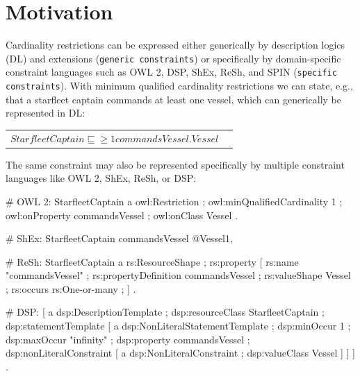 \documentclass{llncs}
\newcommand{\ms}[1]{\texttt{#1}}
\newenvironment{DL}{
  \vspace{0.3cm}
	\begin{center}
  \begin{tabular}{r l}

}{
  \end{tabular}
	\end{center}
}
\begin{document}


\section{Motivation}

Cardinality restrictions can be expressed either generically by description logics (DL) and extensions (\ms{generic constraints}) 
or specifically  by domain-specific constraint languages such as OWL 2, DSP, ShEx, ReSh, and SPIN (\ms{specific constraints}).
With minimum qualified cardinality restrictions we can state, 
e.g., that a starfleet captain commands at least one vessel, which can generically be represented in DL:

\begin{DL}
$StarfleetCaptain \sqsubseteq \geq1 commandsVessel . Vessel $
\end{DL}

The same constraint may also be represented specifically by multiple constraint languages like OWL 2, ShEx, ReSh, or DSP:

\begin{ex}
# OWL 2:
StarfleetCaptain
    a owl:Restriction ;
    owl:minQualifiedCardinality 1 ;
    owl:onProperty commandsVessel ;
    owl:onClass Vessel .
		
# ShEx:
StarfleetCaptain { commandsVessel @Vessel{1, } }

# ReSh:
StarfleetCaptain a rs:ResourceShape ; rs:property [
    rs:name "commandsVessel" ; rs:propertyDefinition commandsVessel ;
    rs:valueShape Vessel ;
    rs:occurs rs:One-or-many ; ] .
		
# DSP:
[   a dsp:DescriptionTemplate ; 
    dsp:resourceClass StarfleetCaptain ; 
    dsp:statementTemplate [ a dsp:NonLiteralStatementTemplate ;
        dsp:minOccur 1 ; dsp:maxOccur "infinity" ; 
        dsp:property commandsVessel ; 
        dsp:nonLiteralConstraint [ a dsp:NonLiteralConstraint ;
            dsp:valueClass Vessel ] ] ] .
\end{ex}
\end{document}
